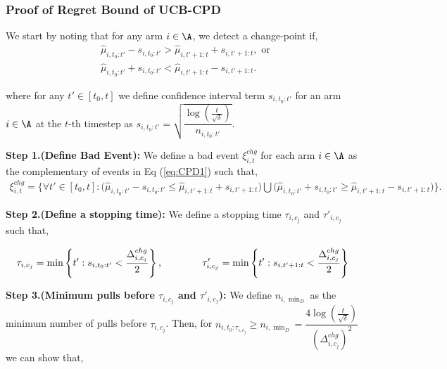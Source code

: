 \subsubsection{Proof of Regret Bound of UCB-CPD}
\label{sec:proof:Theorem:1}


\begin{customproof}{1}
\label{proof:Lemma:1}
\label{proof:Theorem:1}
We start by noting that for any arm $i\in\A$, we detect a change-point if,
\begin{eqnarray}
&\hat{\mu}_{i,t_0:t'} - s_{i,t_0:t'} > \hat{\mu}_{i,t'+1:t} + s_{i,t'+1:t}, \text{ or }\nonumber\\ 
&\hat{\mu}_{i,t_0:t'} +  s_{i,t_0:t'} < \hat{\mu}_{i,t'+1:t} - s_{i,t'+1:t}. \label{eq:CPD1}
\end{eqnarray}
 
where for any $t'\in[t_0,t]$ we define confidence interval term $s_{i,t_0:t'}$ for an arm $i\in\A$ at the $t$-th timestep as $s_{i,t_0:t'} = \sqrt{\dfrac{\log(\frac{t}{\sqrt{\delta}})}{n_{i,t_0:t'}}}$.
 
\textbf{Step 1.(Define Bad Event):} We define a bad event $\xi^{chg}_{i,t}$ for each arm $i\in\A$ as the complementary of events in Eq (\ref{eq:CPD1}) such that,
\begin{eqnarray}
\xi^{chg}_{i,t} = \bigg\lbrace\forall t'\in [t_0 , t]: \big(\hat{\mu}_{i,t_0:t'} - s_{i,t_0:t'} \leq \hat{\mu}_{i,t'+1:t} + s_{i,t'+1:t}\big) \bigcup \big(\hat{\mu}_{i,t_0:t'} +  s_{i,t_0:t'} \geq \hat{\mu}_{i,t'+1:t} - s_{i,t'+1:t}\big)\bigg\rbrace. \label{event:1}
\end{eqnarray}

\textbf{Step 2.(Define a stopping time):} We define a stopping time $\tau_{i,c_j}$ and $\tau'_{i,c_j}$ such that,

\begin{align*}
\tau_{i,c_j} = \min\left\lbrace t': s_{i,t_0:t'} < \dfrac{\Delta^{chg}_{i,c_j}}{2} \right\rbrace ,\hspace*{4em}
\tau'_{i,c_j} = \min\left\lbrace t': s_{i,t'+1:t} < \dfrac{\Delta^{chg}_{i,c_j}}{2} \right\rbrace
\end{align*}


\textbf{Step 3.(Minimum pulls before $\tau_{i,c_j}$ and $\tau'_{i,c_j}$): } We define $n_{i,\min_{D}}$ as the minimum number of pulls  before $\tau_{i,c_j}$. Then, for $n_{i,t_0:\tau_{i,c_j}}\geq n_{i,\min_{D}} = \dfrac{4\log(\frac{t}{\sqrt{\delta}})}{(\Delta^{chg}_{i,c_j})^2}$ we can show that,


\end{customproof}
